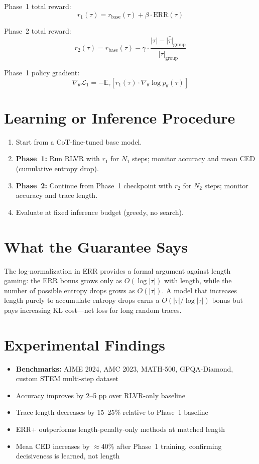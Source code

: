 \documentclass[10pt,twocolumn]{article}
\begin{document}
Phase~1 total reward:
\[
r_1(\tau) = r_{\mathrm{base}}(\tau) + \beta\cdot\mathrm{ERR}(\tau)
\]

Phase~2 total reward:
\[
r_2(\tau) = r_{\mathrm{base}}(\tau)
  - \gamma\cdot\frac{|\tau|-\bar{|\tau|}_{\mathrm{group}}}
                    {\bar{|\tau|}_{\mathrm{group}}}
\]

Phase~1 policy gradient:
\[
\nabla_\theta\mathcal{L}_1
= -\mathbb{E}_\tau\!\left[r_1(\tau)\cdot
  \nabla_\theta\log p_\theta(\tau)\right]
\]

\section{Learning or Inference Procedure}

\begin{enumerate}[itemsep=2pt,parsep=0pt]
  \item Start from a CoT-fine-tuned base model.
  \item \textbf{Phase~1:} Run RLVR with $r_1$ for $N_1$ steps;
    monitor accuracy and mean CED (cumulative entropy drop).
  \item \textbf{Phase~2:} Continue from Phase~1 checkpoint with $r_2$
    for $N_2$ steps; monitor accuracy and trace length.
  \item Evaluate at fixed inference budget (greedy, no search).
\end{enumerate}

\section{What the Guarantee Says}

The log-normalization in ERR provides a formal argument against length
gaming: the ERR bonus grows only as $O(\log |\tau|)$ with length, while
the number of possible entropy drops grows as $O(|\tau|)$. A model that
increases length purely to accumulate entropy drops earns a
$O(|\tau| / \log|\tau|)$ bonus but pays increasing KL cost---net loss
for long random traces.

\section{Experimental Findings}

\begin{itemize}[itemsep=2pt,parsep=0pt]
  \item \textbf{Benchmarks:} AIME 2024, AMC 2023, MATH-500,
    GPQA-Diamond, custom STEM multi-step dataset
  \item Accuracy improves by 2--5 pp over RLVR-only baseline
  \item Trace length decreases by 15--25\% relative to Phase~1 baseline
  \item ERR+ outperforms length-penalty-only methods at matched length
  \item Mean CED increases by $\approx$40\% after Phase~1 training,
    confirming decisiveness is learned, not length
\end{itemize}
\end{document}
